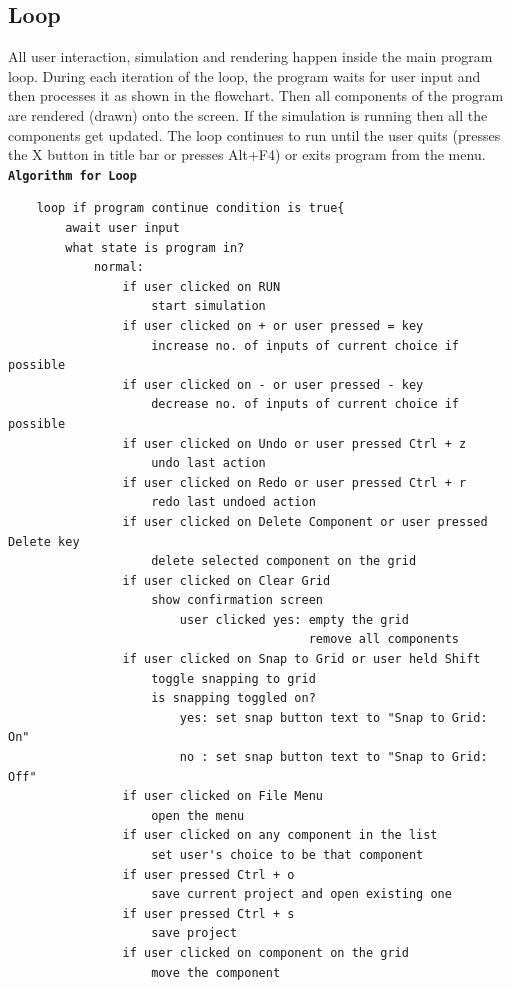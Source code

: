 \documentclass[report]{subfiles}
\begin{document}
    \subsection{Loop}
    All user interaction, simulation and rendering happen inside the main program loop. During each iteration of the loop, the program waits for user input and then processes it as shown in the flowchart. Then all components of the program are rendered (drawn) onto the screen. If the simulation is running then all the components get updated. The loop continues to run until the user quits (presses the X button in title bar or presses Alt+F4) or exits program from the menu.\\
        \textbf{\texttt{Algorithm for Loop}}
        \begin{verbatim}
    loop if program continue condition is true{
        await user input
        what state is program in?
            normal:
                if user clicked on RUN
                    start simulation
                if user clicked on + or user pressed = key
                    increase no. of inputs of current choice if possible
                if user clicked on - or user pressed - key
                    decrease no. of inputs of current choice if possible
                if user clicked on Undo or user pressed Ctrl + z
                    undo last action
                if user clicked on Redo or user pressed Ctrl + r
                    redo last undoed action
                if user clicked on Delete Component or user pressed Delete key
                    delete selected component on the grid
                if user clicked on Clear Grid
                    show confirmation screen
                        user clicked yes: empty the grid
                                          remove all components
                if user clicked on Snap to Grid or user held Shift
                    toggle snapping to grid
                    is snapping toggled on?
                        yes: set snap button text to "Snap to Grid: On"
                        no : set snap button text to "Snap to Grid: Off"
                if user clicked on File Menu
                    open the menu
                if user clicked on any component in the list
                    set user's choice to be that component
                if user pressed Ctrl + o
                    save current project and open existing one
                if user pressed Ctrl + s
                    save project
                if user clicked on component on the grid
                    move the component

\end{verbatim}
\end{document}
